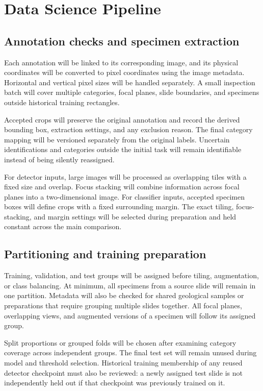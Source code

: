 \documentclass[conference,letterpaper]{IEEEtran}
\begin{document}
\section{Data Science Pipeline}
\subsection{Annotation checks and specimen extraction}
Each annotation will be linked to its corresponding image, and its physical coordinates will be converted to pixel coordinates using the image metadata. Horizontal and vertical pixel sizes will be handled separately. A small inspection batch will cover multiple categories, focal planes, slide boundaries, and specimens outside historical training rectangles.

Accepted crops will preserve the original annotation and record the derived bounding box, extraction settings, and any exclusion reason. The final category mapping will be versioned separately from the original labels. Uncertain identifications and categories outside the initial task will remain identifiable instead of being silently reassigned.

For detector inputs, large images will be processed as overlapping tiles with a fixed size and overlap. Focus stacking will combine information across focal planes into a two-dimensional image. For classifier inputs, accepted specimen boxes will define crops with a fixed surrounding margin. The exact tiling, focus-stacking, and margin settings will be selected during preparation and held constant across the main comparison.

\subsection{Partitioning and training preparation}
Training, validation, and test groups will be assigned before tiling, augmentation, or class balancing. At minimum, all specimens from a source slide will remain in one partition. Metadata will also be checked for shared geological samples or preparations that require grouping multiple slides together. All focal planes, overlapping views, and augmented versions of a specimen will follow its assigned group.

Split proportions or grouped folds will be chosen after examining category coverage across independent groups. The final test set will remain unused during model and threshold selection. Historical training membership of any reused detector checkpoint must also be reviewed: a newly assigned test slide is not independently held out if that checkpoint was previously trained on it.
\end{document}

